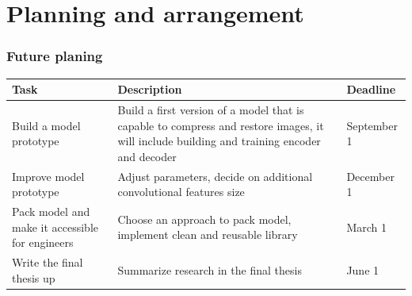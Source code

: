 \documentclass[10pt]{beamer}
\begin{document}
\section{Planning and arrangement}
\begin{frame}
    \frametitle{Future planing}
    \begin{table}
        \centering
        \begin{tabular}{p{3cm}|p{5cm}|p{2cm}}
            \hline
            Task                                            & Description                                                                                                                                & Deadline    \\
            \hline
            Build a model prototype                         & Build a first version of a model that is capable to compress and restore images, it will include building and training encoder and decoder & September 1 \\
            \hline
            Improve model prototype                         & Adjust parameters, decide on additional convolutional features size                                                                        & December 1  \\
            \hline
            Pack model and make it accessible for engineers & Choose an approach to pack model, implement clean and reusable library                                                                     & March 1     \\
            \hline
            Write the final thesis up                       & Summarize research in the final thesis                                                                                                     & June 1      \\
            \hline
        \end{tabular}
    \end{table}
\end{frame}
\end{document}
